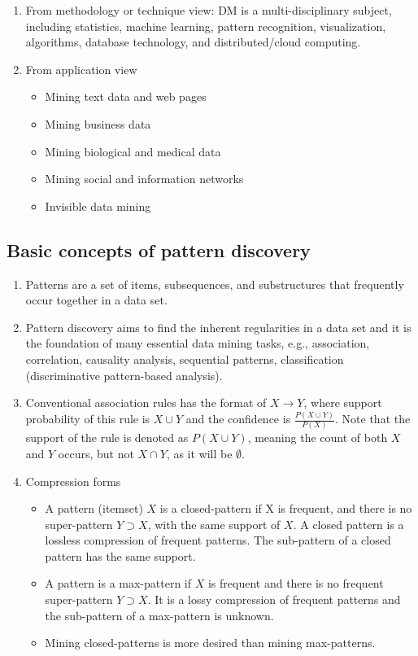 \documentclass[12pt, a4paper]{article}
\begin{document}
\begin{enumerate}
\item From methodology or technique view: DM is a multi-disciplinary subject, including statistics, machine learning, pattern recognition, visualization, algorithms, database technology, and distributed/cloud computing.

\item From application view
 \begin{itemize}
  \item Mining text data and web pages
  \item Mining business data
  \item Mining biological and medical data
  \item Mining social and information networks
  \item Invisible data mining
 \end{itemize}
\end{enumerate}

\subsection{Basic concepts of pattern discovery}
\begin{enumerate}

\item Patterns are a set of items, subsequences, and substructures that frequently occur together in a data set.

\item Pattern discovery aims to find the inherent regularities in a data set and it is the foundation of many essential data mining tasks, e.g., association, correlation, causality analysis, sequential patterns, classification (discriminative pattern-based analysis).

\item Conventional association rules has the format of $X \rightarrow Y$, where support probability of this rule is $X \cup Y$ and the confidence is $\frac{P(X \cup Y)}{P(X)}$. Note that the support of the rule is denoted as $P(X \cup Y)$, meaning the count of both $X$ and $Y$ occurs, but not $X \cap Y$, as it will be $\emptyset$.

\item Compression forms
\begin{itemize}
\item A pattern (itemset) $X$ is a closed-pattern if X is frequent, and there is no super-pattern $Y \supset X$, with the same support of $X$. A closed pattern is a lossless compression of frequent patterns. The sub-pattern of a closed pattern has the same support.

\item A pattern is a max-pattern if $X$ is frequent and there is no frequent super-pattern $Y \supset X$. It is a lossy compression of frequent patterns and the sub-pattern of a max-pattern is unknown.

\item Mining closed-patterns is more desired than mining max-patterns.
\end{itemize}
\end{enumerate}
\end{document}
